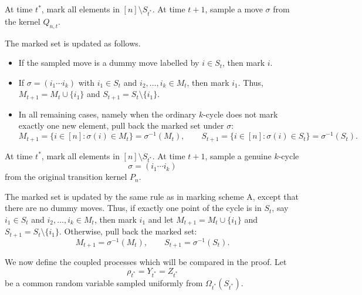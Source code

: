 \begin{defi}
At time $t^*$, mark all elements in $[n]\setminus S_{t^*}$. At time $t+1$,
sample a move $\sigma$ from the kernel $Q_{n,t}$.

The marked set is updated as follows.
\begin{itemize}
\item If the sampled move is a dummy move labelled by $i\in S_t$, then mark
$i$.
\item If $\sigma=(i_1\cdots i_k)$ with $i_1\in S_t$ and
$i_2,\ldots,i_k\in M_t$, then mark $i_1$. Thus, $M_{t+1} = M_t \cup \{i_1\}$ and $S_{t+1} = S_t \setminus \{i_1\}$.
\item In all remaining cases, namely when the ordinary $k$-cycle does not
mark exactly one new element, pull back the marked set under $\sigma$:
$$
M_{t+1}=\{i\in[n]:\sigma(i)\in M_t\}=\sigma^{-1}(M_t),
\qquad
S_{t+1}=\{i\in[n]:\sigma(i)\in S_t\}=\sigma^{-1}(S_t).
$$
\end{itemize}
\end{defi}

\begin{defi}
At time $t^*$, mark all elements in $[n]\setminus S_{t^*}$. At time $t+1$,
sample a genuine $k$-cycle
$$
\sigma=(i_1\cdots i_k)
$$
from the original transition kernel $P_n$.

The marked set is updated by the same rule as in marking scheme A, except that
there are no dummy moves. Thus, if exactly one point of the cycle is in $S_t$,
say $i_1\in S_t$ and $i_2,\ldots,i_k\in M_t$, then mark $i_1$ and let $M_{t+1} = M_t \cup \{i_1\}$ and $S_{t+1} = S_t \setminus \{i_1\}$. Otherwise, pull
back the marked set:
$$
M_{t+1}=\sigma^{-1}(M_t),
\qquad
S_{t+1}=\sigma^{-1}(S_t).
$$
\end{defi}

We now define the coupled processes which will be compared in the proof. Let
$$
\rho_{t^*}=Y_{t^*}=Z_{t^*}
$$
be a common random variable sampled uniformly from
$\Omega_{t^*}(S_{t^*})$.

